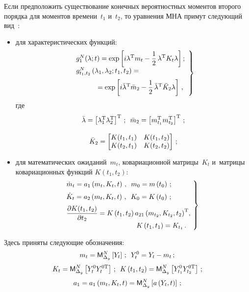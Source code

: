 \begin{multicols}{2}
Если предположить существование конечных вероятностных моментов второго 
порядка для моментов времени~$t_1$ и~$t_2$, то уравнения МНА примут следующий 
вид~\cite{1-sin, 5-sin, 6-sin}:
\begin{itemize}
\item для характеристических функций:
    \begin{equation}
    \left.
    \begin{array}{l}
    g_1^N (\la;t) \displaystyle=\exp \lk i\la^{\mathrm{T}} m_t - 
    \fr{1}{2}\, \la^{\mathrm{T}} K_t \la\rk;\\[6pt]
    g_{t_1, t_2}^N     \left(\la_1, \la_2;t_1, t_2 \right)={}\\[6pt]
     \hspace*{10mm}\displaystyle{} =
    \exp \lk i\bar \la^{\mathrm{T}} \bar m_2 - 
    \fr{1}{2}\,\bar \la^{\mathrm{T}} \bar K_2 \la\rk\,,
    \end{array}
    \right\}
    \label{e8.3-sin}
    \end{equation}
    где
    \begin{gather*}
    \bar {\lambda} =\left[ \lambda_1^{\mathrm{T}}\lambda_2^{\mathrm{T}}\right]^{\mathrm{T}}\,; \enskip
    \bar m_2 = \left[ m_{t_1}^{\mathrm{T}} m_{t_2}^{\mathrm{T}}\right]^{\mathrm{T}}\,;\\[9pt] 
    \bar K_2= \begin{bmatrix}
    K(t_1, t_1)& K(t_1, t_2)\\
    K(t_2, t_1)& K(t_2, t_2)\end{bmatrix}\,;
   \end{gather*}

\item  для математических ожиданий~$m_t$, ковариационной матрицы~$K_t$ и~матрицы 
ковариационных функций $K(t_1, t_2)$:
    \begin{equation}
    \left.
    \hspace*{-3mm}\begin{array}{l}
    \dot m_t = a_1 \left(m_t, K_t, t\right)\,,\enskip m_0 = m\left(t_0\right)\,;
   \\[6pt]
    \dot K_t = a_2 \left(m_t, K_t, t\right)\,,\enskip K_0 = K\left(t_0\right)\,;
   \\[6pt]
    \fr{\prt K(t_1, t_2)}{\prt t_2 }= K\left(t_1, t_2\right) 
    a_{21} \left(m_{t_2}, K_{t_2}, t_2\right)^{\mathrm{T}}\!,\\[6pt] 
    \hspace*{36mm}K\left(t_1, t_1\right) = K_{t_1}\,.
    \end{array}\!
    \right\}\!
    \label{e8.4-sin}
    \end{equation}
    \end{itemize}
Здесь приняты следующие обозначения:
    $$
    m_t = {\sf M}_{\Delta_y}^N \left[ Y_t\right] \,;\enskip 
    Y_t^0 = Y_t - m_t\,;$$
    $$
    K_t = {\sf M}_{\Delta_y}^N \left[ Y_t^0 Y_t^{0\mathrm{T}}\right] \,;\enskip 
    K\left(t_1, t_2\right) = {\sf M}_{\Delta_y}^N \left[ Y_{t_1}^{0} Y_{t_2}^{0\mathrm{T}}\right] \,;
    $$
    $$
    a_1 = a_1\left(m_t, K_t, t\right) = {\sf M}_{\Delta_y}^N \left[ a \left(Y_t, t\right)\right]\,;
    $$


\end{multicols}
